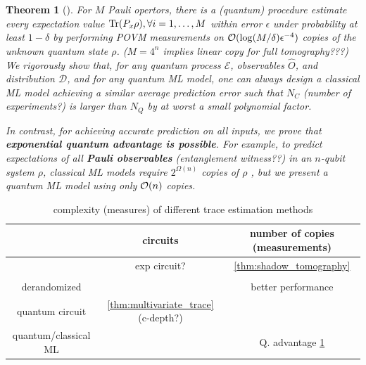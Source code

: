 \documentclass[
aps,
pra,
floatfix,
]{revtex4-2}
\theoremstyle{plain}
\newtheorem{theorem}{Theorem}
\theoremstyle{definition}
\newcommand{\ob}{\hat{O}}
\newcommand{\dm}{\rho}
\begin{document}
\begin{theorem}[\cite{huangInformationtheoreticBoundsQuantum2021}]\label{thm:quantum_ml_estimate_bound}
	For $M$ Pauli opertors, there is a (quantum) procedure estimate every expectation value $\Tr(P_x \dm),\forall i=1,\dots,M$ within error $\epsilon$ under probability at least $1-\delta $ by performing POVM measurements on $\mathcal{O}(\log(M/\delta)\epsilon^{-4})$ copies of the unknown quantum state $\dm$.
	($M=4^n$ implies linear copy for full tomography???)
	We rigorously show that, for any quantum process $\mathcal{E}$, observables $\ob$, and distribution $\mathcal{D}$, and for any quantum ML model, one can always design a classical ML model achieving a similar average prediction error such that $N_C$ (number of experiments?) is larger than $N_Q$ by at worst a small polynomial factor.

	In contrast, for achieving accurate prediction on all inputs, we prove that \textbf{exponential quantum advantage is possible}. For example, to predict expectations of all \textbf{Pauli observables} (entanglement witness??) in an $n$-qubit system $\dm$, classical ML models require $2^{\Omega(n)}$ copies of $\dm$ , but we present a quantum ML model using only $\mathcal{O}(n)$ copies.
\end{theorem}
\cite{huangPredictingManyProperties2020}
\cite{huangInformationtheoreticBoundsQuantum2021}
\cite{huangPowerDataQuantum2021}
\cite{aaronsonShadowTomographyQuantum2018}
\begin{table}[!ht]
	\centering
	\begin{tabular}{c|c|c}
		& circuits & number of copies (measurements) \\
		\hline
		\nameref{prm:shadow_tomography} & exp circuit? & \cref{thm:shadow_tomography} \\  
		\nameref{def:classical_shadow} & & \\
		derandomized & & better performance \\  
		quantum circuit  \nameref{def:entanglement_spectroscopy} &  \cref{thm:multivariate_trace} (c-depth?) & \\  
		quantum/classical ML  & & Q. advantage 
		\cref{thm:quantum_ml_estimate_bound} \\  
		\hline
	\end{tabular}
	\caption{complexity (measures) of different trace estimation methods}
\end{table}
\end{document}
